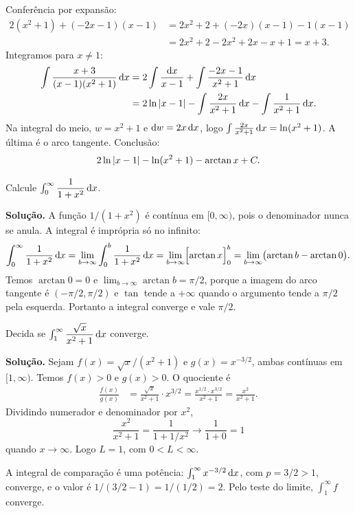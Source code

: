 \documentclass[11pt,a4paper]{article}
\begin{document}
Conferência por expansão:
\begin{align*}
2(x^{2}+1)+(-2x-1)(x-1)
&=2x^{2}+2+(-2x)(x-1)-1(x-1)\\
&=2x^{2}+2-2x^{2}+2x-x+1
=x+3.
\end{align*}
Integramos para \(x\neq 1\):
\begin{align*}
\int\frac{x+3}{(x-1)(x^{2}+1)}\,\mathrm{d} x
&=2\int\frac{\mathrm{d} x}{x-1}+\int\frac{-2x-1}{x^{2}+1}\,\mathrm{d} x\\
&=2\ln\left\lvert x-1 \right\rvert-\int\frac{2x}{x^{2}+1}\,\mathrm{d} x-\int\frac{1}{x^{2}+1}\,\mathrm{d} x.
\end{align*}
Na integral do meio, \(w=x^{2}+1\) e \(\mathrm{d} w=2x\,\mathrm{d} x\), logo \(\int\frac{2x}{x^{2}+1}\,\mathrm{d} x=\ln(x^{2}+1)\). A última é o arco tangente. Conclusão:
\[
2\ln\left\lvert x-1 \right\rvert-\ln(x^{2}+1)-\arctan x+C.
\]

\begin{exercicio}[Intermediário --- I3]
Calcule \(\int_0^{\infty}\dfrac{1}{1+x^{2}}\,\mathrm{d} x\).
\end{exercicio}

\noindent\textbf{Solução.}
A função \(1/(1+x^{2})\) é contínua em \([0,\infty)\), pois o denominador nunca se anula. A integral é imprópria só no infinito:
\[
\int_0^{\infty}\frac{1}{1+x^{2}}\,\mathrm{d} x
=\lim_{b\to\infty}\int_0^{b}\frac{1}{1+x^{2}}\,\mathrm{d} x
=\lim_{b\to\infty}\Bigl[\arctan x\Bigr]_0^{b}
=\lim_{b\to\infty}\bigl(\arctan b-\arctan 0\bigr).
\]
Temos \(\arctan 0=0\) e \(\lim_{b\to\infty}\arctan b=\pi/2\), porque a imagem do arco tangente é \((-\pi/2,\pi/2)\) e \(\tan\) tende a \(+\infty\) quando o argumento tende a \(\pi/2\) pela esquerda. Portanto a integral converge e vale \(\pi/2\).

\begin{exercicio}[Intermediário --- I4]
Decida se \(\int_1^{\infty}\dfrac{\sqrt{x}}{x^{2}+1}\,\mathrm{d} x\) converge.
\end{exercicio}

\noindent\textbf{Solução.}
Sejam \(f(x)=\sqrt{x}/(x^{2}+1)\) e \(g(x)=x^{-3/2}\), ambas contínuas em \([1,\infty)\). Temos \(f(x)>0\) e \(g(x)>0\). O quociente é
\begin{align*}
\frac{f(x)}{g(x)}
&=\frac{\sqrt{x}}{x^{2}+1}\cdot x^{3/2}
=\frac{x^{1/2}\cdot x^{3/2}}{x^{2}+1}
=\frac{x^{2}}{x^{2}+1}.
\end{align*}
Dividindo numerador e denominador por \(x^{2}\),
\[
\frac{x^{2}}{x^{2}+1}=\frac{1}{1+1/x^{2}}\to\frac{1}{1+0}=1
\]
quando \(x\to\infty\). Logo \(L=1\), com \(0<L<\infty\).

A integral de comparação é uma potência: \(\int_1^{\infty} x^{-3/2}\,\mathrm{d} x\), com \(p=3/2>1\), converge, e o valor é \(1/(3/2-1)=1/(1/2)=2\). Pelo teste do limite, \(\int_1^{\infty} f\) converge.
\end{document}
